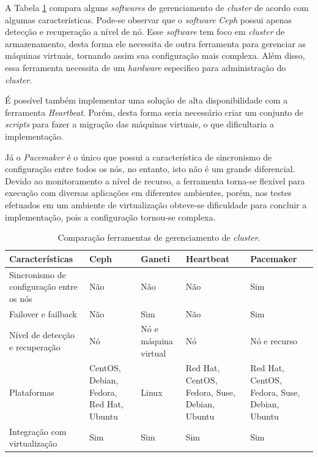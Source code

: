 A Tabela \ref{tab:clusterger} compara alguns \textit{softwares} de gerenciamento de \textit{cluster} de acordo com algumas características. 
Pode-se observar que o \textit{software} \textit{Ceph} possui apenas detecção e recuperação a nível de nó. Esse \textit{software} tem foco 
em \textit{cluster} de armazenamento, desta forma ele necessita de outra ferramenta para gerenciar as máquinas virtuais, tornando assim sua 
configuração mais complexa. Além disso, essa ferramenta necessita de um \textit{hardware} especifico para administração do \textit{cluster}.

É possível também implementar uma solução de alta disponibilidade com a ferramenta \textit{Heartbeat}. Porém, desta forma seria necessário criar 
um conjunto de \textit{scripts} para fazer a migração das máquinas virtuais, o que dificultaria a implementação.

Já o \textit{Pacemaker} é o único que possui a característica de sincronismo de configuração entre todos os nós, no entanto, isto não é um 
grande diferencial. Devido ao monitoramento a nível de recurso, a ferramenta torna-se flexível para execução com diversas aplicações em 
diferentes ambientes, porém, nos testes efetuados em um ambiente de virtualização obteve-se dificuldade para concluir a implementação, pois a 
configuração tornou-se complexa.

\begin{table}[h!]
\caption{Comparação ferramentas de gerenciamento de \textit{cluster}.}
\label{tab:clusterger}
\begin{center}
\begin{tabular}{|p{3.5cm}|p{2.7cm}|p{2cm}|p{2.7cm}|p{2.7cm}|}\hline
\textbf{Características} & \textbf{Ceph} & \textbf{Ganeti} & \textbf{Heartbeat} & \textbf{Pacemaker} \\\hline
Sincronismo de configuração entre os nós & Não & Não & Não & Sim \\\hline
Failover e failback & Não & Sim & Não & Sim \\\hline
Nível de detecção e recuperação & Nó & Nó e máquina virtual & Nó & Nó e recurso \\\hline
Plataformas & CentOS, Debian, Fedora, Red Hat, Ubuntu & Linux & Red Hat, CentOS, Fedora, Suse, Debian, Ubuntu & Red Hat, CentOS, Fedora, Suse, Debian, Ubuntu \\\hline
Integração com virtualização & Sim & Sim & Sim & Sim \\\hline
\end{tabular}
\end{center}
\end{table}

